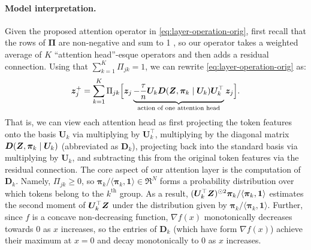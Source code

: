 \documentclass[../../book-main.tex]{subfiles}
\begin{document}
\paragraph{Model interpretation.} Given the proposed attention operator in \eqref{eq:layer-operation-orig}, first recall that the rows of $\bm\Pi$ are non-negative and sum to 1
, so our operator takes a weighted average of $K$ ``attention head''-esque operators and then adds a residual connection. Using that \(\sum_{k = 1}^{K}\Pi_{jk} = 1\), we can rewrite \eqref{eq:layer-operation-orig} as: %
\vspace{-2mm}
\begin{equation}
\label{eq:z_up}
    \bm{z}_j^+ = \sum_{k=1}^K \Pi_{jk} \Big[ \bm{z}_j \underbrace{- \frac{\tau}{n} \bm U_{k} \bm D(\bm{Z}, \bm \pi_{k} \mid \bm U_{k}) \bm U_{k}^{\top}}_{\text{action of one attention head}} \bm{z}_j \Big].
\end{equation}
That is, we can view each attention head as first projecting the token features onto the basis $\bm U_{k}$ via multiplying by $\bm U_k^\top$, multiplying by the diagonal matrix $\bm D(\bm{Z}, \bm \pi_{k} \mid \bm U_{k})$ (abbreviated as \(\bm D_{k}\)), projecting back into the standard basis via multiplying by $\bm U_{k}$, and subtracting this from the original token features via the residual connection. The core aspect of our attention layer is the computation of $\bm D_{k}$.  Namely, \(\Pi_{jk} \geq 0\), so $\bm \pi_k / \langle \bm \pi_{k}, \bm 1\rangle \in \Re^N$ forms a probability distribution over which tokens belong to the $k^\text{th}$ group.  As a result, $(\bm U^\top_k \bm{Z})^{\odot 2} \bm \pi_k / \langle \bm \pi_{k}, \bm 1\rangle$ estimates the second moment of $\bm U_k^\top \bm{Z}$ under the distribution given by $\bm \pi_k /  \langle \bm \pi_{k}, \bm 1\rangle$.  Further, since $f$ is a concave non-decreasing function, $\nabla f(x)$ monotonically decreases towards $0$ as $x$ increases, so the entries of $\bm D_{k}$ (which have form $\nabla f(x)$) achieve their maximum at $x=0$ %
and decay monotonically to $0$ as $x$ increases.
\end{document}
